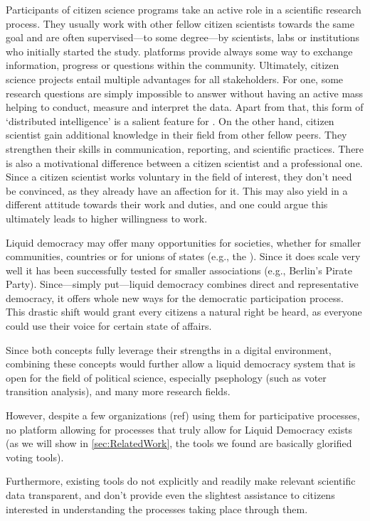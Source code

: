 Participants of citizen science programs take an active role in a scientific research process. They usually work with other fellow citizen scientists towards the same goal and are often supervised---to some degree---by scientists, labs or institutions who initially started the study.  platforms provide always some way to exchange information, progress or questions within the community. Ultimately, citizen science projects entail multiple advantages for all stakeholders. For one, some research questions are simply impossible to answer without having an active mass helping to conduct, measure and interpret the data. Apart from that, this form of ‘distributed intelligence’ is a salient feature for . On the other hand, citizen scientist gain additional knowledge in their field from other fellow peers. They strengthen their skills in communication, reporting, and scientific practices. There is also a motivational difference between a citizen scientist and a professional one. Since a citizen scientist works voluntary in the field of interest, they don’t need be convinced, as they already have an affection for it. This may also yield in a different attitude towards their work and duties, and one could argue this ultimately leads to higher willingness to work.

Liquid democracy may offer many opportunities for societies, whether for smaller communities, countries or for unions of states (e.g., the ). Since it does scale very well it has been successfully tested for smaller associations (e.g., Berlin’s Pirate Party). Since---simply put---liquid democracy combines direct and representative democracy, it offers whole new ways for the democratic participation process. This drastic shift would grant every citizens a natural right be heard, as everyone could use their voice for certain state of affairs.

Since both concepts fully leverage their strengths in a digital environment, combining these concepts would further allow a liquid democracy system that is open for the field of political science, especially psephology (such as voter transition analysis), and many more research fields.

However, despite a few organizations (ref) using them for participative processes, no platform allowing for processes that truly allow for Liquid Democracy exists (as we will show in \ref{sec:RelatedWork}, the tools we found are basically glorified voting tools). 

Furthermore, existing tools do not explicitly and readily make relevant scientific data transparent, and don't provide even the slightest assistance to citizens interested in understanding the processes taking place through them. 

